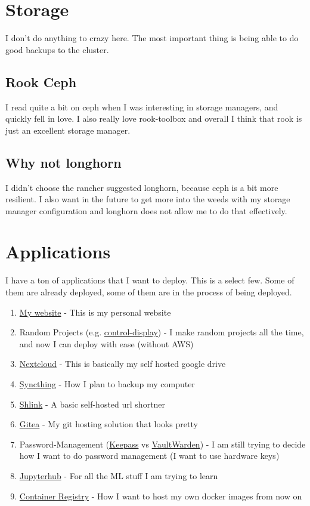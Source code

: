 \documentclass[12pt]{article}
\begin{document}
\section{Storage}
I don't do anything to crazy here. The most important thing is being able to do good backups to the cluster.

\subsection{Rook Ceph}
I read quite a bit on ceph when I was interesting in storage managers, and quickly fell in love. I also really love rook-toolbox and overall I think that rook is just an excellent storage manager.

\subsection{Why not longhorn}
I didn't choose the rancher suggested longhorn, because ceph is a bit more resilient. I also want in the future to get more into the weeds with my storage manager configuration and longhorn does not allow me to do that effectively.

\section{Applications}
I have a ton of applications that I want to deploy. This is a select few. Some of them are already deployed, some of them are in the process of being deployed.
\begin{enumerate}
    \item \href{https://sachiniyer.com}{My website} - This is my personal website
    \item Random Projects (e.g. \href{https://school-demo.sachiniyer.com}{control-display}) - I make random projects all the time, and now I can deploy with ease (without AWS)
    \item \href{https://nextcloud.com}{Nextcloud} - This is basically my self hosted google drive
    \item \href{https://syncthing.net}{Syncthing} - How I plan to backup my computer
    \item \href{https://shlink.io}{Shlink} - A basic self-hosted url shortner
    \item \href{https://gitea.io}{Gitea} - My git hosting solution that looks pretty
    \item Password-Management (\href{https://keepassxc.org}{Keepass} vs \href{https://github.com/dani-garcia/vaultwarden}{VaultWarden}) - I am still trying to decide how I want to do password management (I want to use hardware keys)
    \item \href{https://jupyterhub.readthedocs.io/en/stable/installation-guide.html}{Jupyterhub} - For all the ML stuff I am trying to learn
    \item \href{https://docs.docker.com/registry/}{Container Registry} - How I want to host my own docker images from now on
\end{enumerate}
\end{document}
